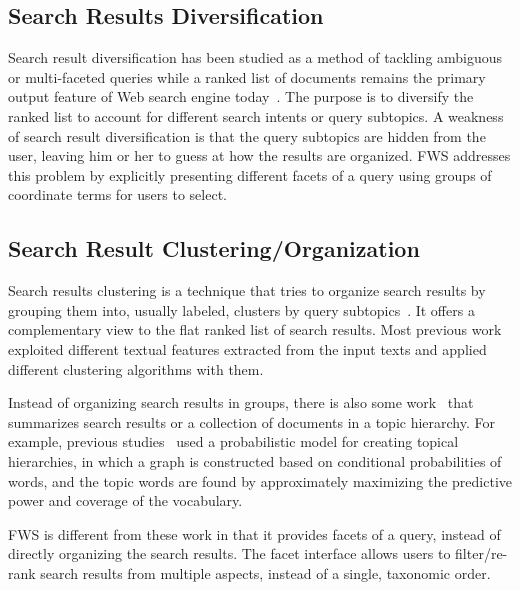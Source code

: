 \subsection{Search Results Diversification}
Search result diversification has been studied as a method of tackling ambiguous or multi-faceted queries while a ranked list of documents remains the primary output feature of Web search engine today~\cite{agrawal2009diversifying,clarke2008novelty,santos2010exploiting,sakai2011evaluating,dang2013term}.
The purpose is to diversify the ranked list to account for different search intents or query subtopics.
A weakness of search result diversification is that the query subtopics are hidden from the user, leaving him or her to guess at how the results are organized.
FWS addresses this problem by explicitly presenting different facets of a query using groups of coordinate terms for users to select.

\subsection{Search Result Clustering/Organization}
Search results clustering is a technique that tries to organize search results by grouping them into, usually labeled, clusters by query subtopics~\cite{carpineto2009survey}.
It offers a complementary view to the flat ranked list of search results.
Most previous work exploited different textual features extracted from the input texts and applied different clustering algorithms with them.

Instead of organizing search results in groups, there is also some work~\cite{lawrie2001finding,lawrie2003generating, nevill1999lexically} that summarizes search results or a collection of documents in a topic hierarchy. For example, previous studies~\cite{lawrie2001finding,lawrie2003generating} used a probabilistic model for creating topical hierarchies, in which a graph is constructed based on conditional probabilities of words, and the topic words are found by approximately maximizing the predictive power and coverage of the vocabulary.

FWS is different from these work in that it provides facets of a query, instead of directly organizing the search results. The facet interface allows users to filter/re-rank search results from multiple aspects, instead of a single, taxonomic order.


